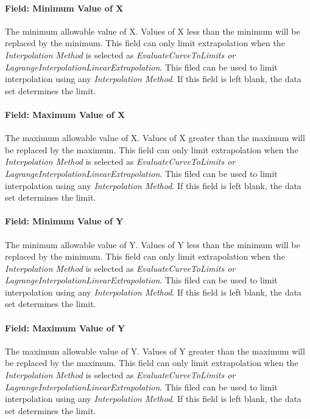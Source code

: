 \paragraph{Field: Minimum Value of X}\label{field-minimum-value-of-x-1-000}

The minimum allowable value of X. Values of X less than the minimum will be replaced by the minimum. This field can only limit extrapolation when the \emph{Interpolation Method} is selected as \emph{EvaluateCurveToLimits or LagrangeInterpolationLinearExtrapolation}. This filed can be used to limit interpolation using any \emph{Interpolation Method}. If this field is left blank, the data set determines the limit.

\paragraph{Field: Maximum Value of X}\label{field-maximum-value-of-x-1-000}

The maximum allowable value of X. Values of X greater than the maximum will be replaced by the maximum. This field can only limit extrapolation when the \emph{Interpolation Method} is selected as \emph{EvaluateCurveToLimits or LagrangeInterpolationLinearExtrapolation}. This filed can be used to limit interpolation using any \emph{Interpolation Method}. If this field is left blank, the data set determines the limit.

\paragraph{Field: Minimum Value of Y}\label{field-minimum-value-of-y-000}

The minimum allowable value of Y. Values of Y less than the minimum will be replaced by the minimum. This field can only limit extrapolation when the \emph{Interpolation Method} is selected as \emph{EvaluateCurveToLimits or LagrangeInterpolationLinearExtrapolation}. This filed can be used to limit interpolation using any \emph{Interpolation Method}. If this field is left blank, the data set determines the limit.

\paragraph{Field: Maximum Value of Y}\label{field-maximum-value-of-y-000}

The maximum allowable value of Y. Values of Y greater than the maximum will be replaced by the maximum. This field can only limit extrapolation when the \emph{Interpolation Method} is selected as \emph{EvaluateCurveToLimits or LagrangeInterpolationLinearExtrapolation}. This filed can be used to limit interpolation using any \emph{Interpolation Method}. If this field is left blank, the data set determines the limit.

